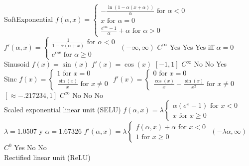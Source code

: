 \documentclass[]{book}
\begin{document}
SoftExponential \textbar{} \textbar{}
\(f(\alpha ,x) = \left\{{\begin{array}{rcl}-{\frac {\ln(1-\alpha (x+\alpha ))}{\alpha }}{\mbox{ for }}\alpha < 0\\x{\mbox{ for }}\alpha =0\\{\frac {e^{\alpha x}-1}{\alpha }}+\alpha {\mbox{ for }}\alpha > 0\end{array}}\right.\)
\textbar{}
\(f'(\alpha ,x)=\left\{{\begin{array}{rcl}{\frac {1}{1-\alpha (\alpha +x)}}{\mbox{ for }}\alpha <0\\e^{\alpha x}{\mbox{ for }}\alpha \geq 0\end{array}}\right.\)
\textbar{} \((- \infty,\infty)\) \textbar{} \(C^\infty\) \textbar{} Yes
\textbar{} Yes \textbar{} Yes iff \(\alpha = 0\) \textbar{}\\
Sinusoid \textbar{} \textbar{} \(f(x)=\sin(x)\) \textbar{}
\(f'(x)=\cos(x)\) \textbar{} \([-1,1]\) \textbar{} \(C^\infty\)
\textbar{} No \textbar{} No \textbar{} Yes \textbar{}\\
Sinc \textbar{} \textbar{}
\(f(x)=\left\{{\begin{array}{rcl}1{\mbox{ for }}x=0\\{\frac {\sin(x)}{x}}{\mbox{ for }}x\neq 0\end{array}}\right.\)
\textbar{}
\(f'(x)=\left\{{\begin{array}{rcl}0{\mbox{ for }}x=0\\{\frac {\cos(x)}{x}}-{\frac {\sin(x)}{x^{2}}}{\mbox{ for }}x\neq 0\end{array}}\right.\)
\textbar{} \([\approx -.217234,1]\) \textbar{} \(C^\infty\) \textbar{}
No \textbar{} No \textbar{} No \textbar{}\\
Scaled exponential linear unit (SELU) \textbar{} \textbar{}
\(f(\alpha ,x)=\lambda \left\{{\begin{array}{rcl}\alpha (e^{x}-1){\mbox{ for }}x<0\\x{\mbox{ for }}x\geq 0\end{array}}\right.\)
\(\lambda =1.0507\) y \(\alpha =1.67326\) \textbar{}
\(f'(\alpha ,x)=\lambda \left\{{\begin{array}{rcl}f(\alpha ,x)+\alpha {\mbox{ for }}x<0\\1{\mbox{ for }}x\geq 0\end{array}}\right.\)
\textbar{} \((-\lambda \alpha,\infty)\) \textbar{} \(C^0\) \textbar{}
Yes \textbar{} No \textbar{} No \textbar{}\\
Rectified linear unit (ReLU) \textbar{} \textbar{}
\end{document}
